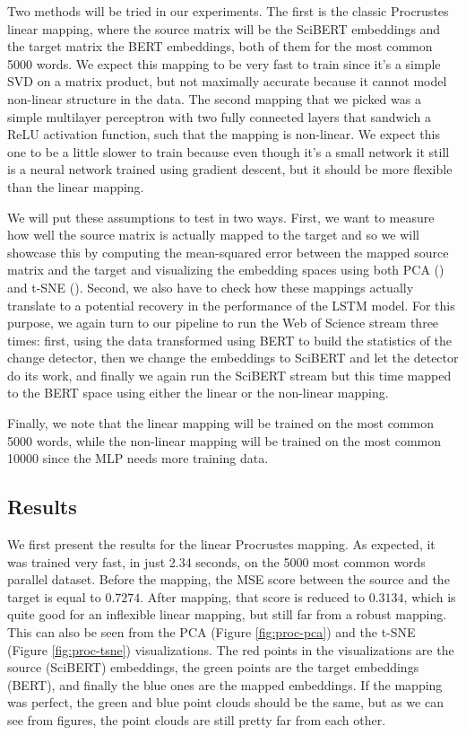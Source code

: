 \documentclass[12pt]{extreport}
\begin{document}
Two methods will be tried in our experiments. The first is the classic Procrustes linear mapping, where the source matrix will be the SciBERT embeddings and the target matrix the BERT embeddings, both of them for the most common 5000 words. We expect this mapping to be very fast to train since it's a simple SVD on a matrix product, but not maximally accurate because it cannot model non-linear structure in the data. The second mapping that we picked was a simple multilayer perceptron with two fully connected layers that sandwich a ReLU activation function, such that the mapping is non-linear. We expect this one to be a little slower to train because even though it's a small network it still is a neural network trained using gradient descent, but it should be more flexible than the linear mapping.

We will put these assumptions to test in two ways. First, we want to measure how well the source matrix is actually mapped to the target and so we will showcase this by computing the mean-squared error between the mapped source matrix and the target and visualizing the embedding spaces using both PCA (\cite{pca}) and t-SNE (\cite{tsne}). Second, we also have to check how these mappings actually translate to a potential recovery in the performance of the LSTM model. For this purpose, we again turn to our pipeline to run the Web of Science stream three times: first, using the data transformed using BERT to build the statistics of the change detector, then we change the embeddings to SciBERT and let the detector do its work, and finally we again run the SciBERT stream but this time mapped to the BERT space using either the linear or the non-linear mapping.

Finally, we note that the linear mapping will be trained on the most common 5000 words, while the non-linear mapping will be trained on the most common 10000 since the MLP needs more training data.

\subsection{Results}

We first present the results for the linear Procrustes mapping. As expected, it was trained very fast, in just 2.34 seconds, on the 5000 most common words parallel dataset. Before the mapping, the MSE score between the source and the target is equal to $0.7274$. After mapping, that score is reduced to $0.3134$, which is quite good for an inflexible linear mapping, but still far from a robust mapping. This can also be seen from the PCA (Figure \ref{fig:proc-pca}) and the t-SNE (Figure \ref{fig:proc-tsne}) visualizations. The red points in the visualizations are the source (SciBERT) embeddings, the green points are the target embeddings (BERT), and finally the blue ones are the mapped embeddings. If the mapping was perfect, the green and blue point clouds should be the same, but as we can see from figures, the point clouds are still pretty far from each other.
\end{document}
